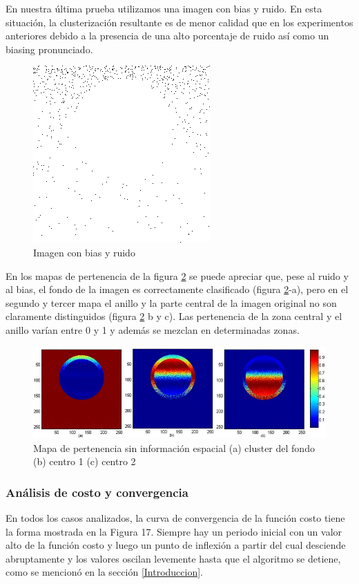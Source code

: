 En nuestra última prueba utilizamos una imagen con bias y ruido. En esta situación, la clusterización resultante es de menor calidad que en los experimentos anteriores debido a la presencia de una alto porcentaje de ruido así como un biasing pronunciado. 

\begin{figure}[H]
\centering
\includegraphics[scale=0.3]{images/biasing_con_ruido.png}
\caption{Imagen con bias y ruido}
\label{fig:circulo_bias_ruido}
\end{figure}

En los mapas de pertenencia de la figura \ref{fig:circulo_bias_ruido_cluster} se puede apreciar que, pese al ruido y al bias, el fondo de la imagen es correctamente clasificado (figura \ref{fig:circulo_bias_ruido_cluster}-a), pero en el segundo y tercer mapa el anillo y la parte central de la imagen original no son claramente distinguidos (figura \ref{fig:circulo_bias_ruido_cluster} b y c). Las pertenencia de la zona central y el anillo varían entre 0 y 1 y además se mezclan en determinadas zonas.

\begin{figure}[H]
\centering
\includegraphics[scale=0.3]{images/bias_sin_coord_con_ruido.jpg}
\caption{Mapa de pertenencia sin información espacial (a) cluster del  fondo (b) centro 1 (c) centro 2}
\label{fig:circulo_bias_ruido_cluster}
\end{figure}

\subsubsection{Análisis de costo y convergencia}
En todos los casos analizados, la curva de convergencia de la función costo tiene la forma mostrada en la Figura 17. Siempre hay un periodo inicial con un valor alto de la función costo y luego un punto de inflexión a partir del cual desciende abruptamente y los valores oscilan levemente hasta que el algoritmo se detiene, como se mencionó en la sección \ref{Introduccion}.

